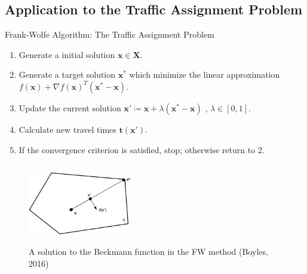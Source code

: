\documentclass{beamer}
\newcommand{\vect}[1]{\boldsymbol{#1}}
\begin{document}
\subsection{Application to the Traffic Assignment Problem}
\begin{frame}{Frank-Wolfe Algorithm: The Traffic Assignment Problem}
\begin{enumerate}
	\item Generate a initial solution $\vect{x} \in \vect{X}$.
	\item Generate a target solution $ \vect{x}^{*}$ which minimize the linear approximation  $ f(\vect{x}) + \nabla f(\vect{x})^T(\vect{x}^*-\vect{x})  $.
	\item Update the current solution $\vect{x'} \coloneqq  \vect{x} + \lambda(\vect{x}^{*}-\vect{x})$ , $\lambda \in [0,1]$.
	\item Calculate new travel times $\vect{t}(\vect{x'})$.
	\item If the convergence criterion is satisfied, stop; otherwise return to 2.
\end{enumerate}
	\begin{figure}
	\includegraphics[width=4.5cm, height=3.5cm]{Fig/FrankWolfeSol.png}
	\caption{A solution to the Beckmann function in the FW method (Boyles, 2016)}
	\end{figure}
\end{frame}
\end{document}
